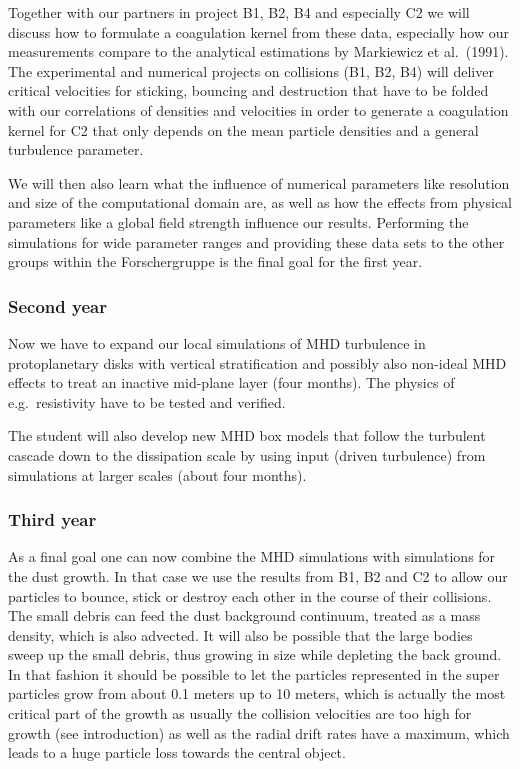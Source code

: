 Together with our partners in project B1, B2, B4 and especially C2 we will
discuss how to formulate a coagulation kernel from these data, especially
how our measurements compare to the analytical estimations by Markiewicz et
al.~(1991).  The experimental and numerical projects on collisions (B1, B2,
B4) will deliver critical velocities for sticking, bouncing and destruction
that have to be folded with our correlations of densities and velocities in
order to generate a coagulation kernel for C2 that only depends on the mean
particle densities and a general turbulence parameter.
 
We will then also learn what the influence of numerical parameters like
resolution and size of the computational domain are, as well as how the
effects from physical parameters like a global field strength influence our
results.  Performing the simulations for wide parameter ranges and providing
these data sets to the other groups within the Forschergruppe is the final
goal for the first year.
\subsubsection{Second year} 
Now we have to expand our local simulations of MHD turbulence in
protoplanetary disks with vertical stratification and possibly also
non-ideal MHD effects to treat an inactive mid-plane layer (four
months). The physics of e.g.\ resistivity have to be tested and verified.

The student will also develop new MHD box models that follow the turbulent
cascade down to the dissipation scale by using input (driven turbulence)
from simulations at larger scales (about four months). 


\subsubsection{Third year}
As a final goal one can now combine the MHD simulations with simulations for
the dust growth.  In that case we use the results from B1, B2 and C2 to
allow our particles to bounce, stick or destroy each other in the course of
their collisions. The small debris can feed the dust background continuum,
treated as a mass density, which is also advected.  It will also be possible
that the large bodies sweep up the small debris, thus growing in size while
depleting the back ground.  In that fashion it should be possible to let the
particles represented in the super particles grow from about 0.1 meters up
to 10 meters, which is actually the most critical part of the growth as
usually the collision velocities are too high for growth (see introduction)
as well as the radial drift rates have a maximum, which leads to a huge
particle loss towards the central object.

